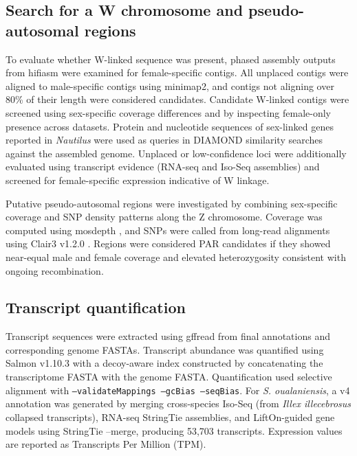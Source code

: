 \documentclass[12pt]{article}
\newcommand{\citep}{\parencite}
\newcommand{\illex}{\textit{Illex illecebrosus}\xspace}
\begin{document}
\subsection*{Search for a W chromosome and pseudo-autosomal regions}

To evaluate whether W-linked sequence was present,
phased assembly outputs from hifiasm were examined for female-specific contigs.
All unplaced contigs were aligned to male-specific contigs using minimap2,
and contigs not aligning over 80\% of their length were considered candidates.
Candidate W-linked contigs were screened using sex-specific coverage differences
and by inspecting female-only presence across datasets.
Protein and nucleotide sequences of sex-linked genes reported in \textit{Nautilus}
\citep{Torrado2025NautilusSex} were used as queries
in DIAMOND similarity searches \citep{buchfink2015diamond} against the assembled genome.
Unplaced or low-confidence loci were additionally evaluated using transcript evidence
(RNA-seq and Iso-Seq assemblies) and screened for female-specific expression
indicative of W linkage.

Putative pseudo-autosomal regions were investigated by combining
sex-specific coverage and SNP density patterns along the Z chromosome.
Coverage was computed using mosdepth \citep{Pedersen2018Mosdepth},
and SNPs were called from long-read alignments
using Clair3 v1.2.0 \citep{Chang2024Clair3}.
Regions were considered PAR candidates if they showed
near-equal male and female coverage
and elevated heterozygosity consistent with ongoing recombination.

\subsection*{Transcript quantification}

Transcript sequences were extracted using gffread from final annotations
and corresponding genome FASTAs.
Transcript abundance was quantified using Salmon v1.10.3 \citep{patro2017salmon}
with a decoy-aware index constructed by concatenating
the transcriptome FASTA with the genome FASTA.
Quantification used selective alignment with
\texttt{--validateMappings --gcBias --seqBias}.
For \textit{S. oualaniensis}, a v4 annotation was generated by merging
cross-species Iso-Seq (from \illex collapsed transcripts),
RNA-seq StringTie assemblies, and LiftOn-guided gene models
using StringTie --merge, producing 53,703 transcripts.
Expression values are reported as Transcripts Per Million (TPM).
\end{document}
